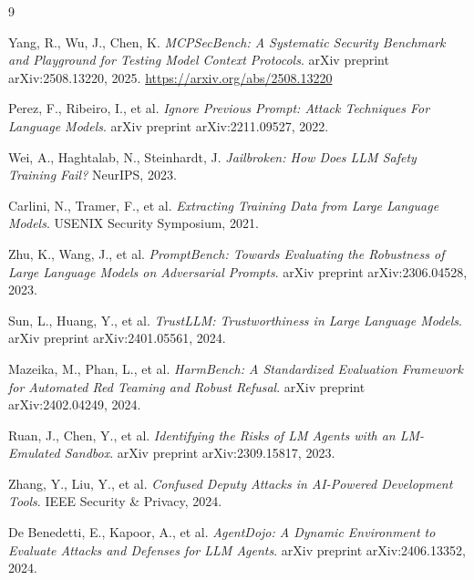 \documentclass[11pt]{article}
\begin{document}

\begin{thebibliography}{9}

Yang, R., Wu, J., Chen, K.
\emph{MCPSecBench: A Systematic Security Benchmark and Playground for Testing Model Context Protocols}.
arXiv preprint arXiv:2508.13220, 2025.
\url{https://arxiv.org/abs/2508.13220}

Perez, F., Ribeiro, I., et al.
\emph{Ignore Previous Prompt: Attack Techniques For Language Models}.
arXiv preprint arXiv:2211.09527, 2022.

Wei, A., Haghtalab, N., Steinhardt, J.
\emph{Jailbroken: How Does LLM Safety Training Fail?}
NeurIPS, 2023.

Carlini, N., Tramer, F., et al.
\emph{Extracting Training Data from Large Language Models}.
USENIX Security Symposium, 2021.

Zhu, K., Wang, J., et al.
\emph{PromptBench: Towards Evaluating the Robustness of Large Language Models on Adversarial Prompts}.
arXiv preprint arXiv:2306.04528, 2023.

Sun, L., Huang, Y., et al.
\emph{TrustLLM: Trustworthiness in Large Language Models}.
arXiv preprint arXiv:2401.05561, 2024.

Mazeika, M., Phan, L., et al.
\emph{HarmBench: A Standardized Evaluation Framework for Automated Red Teaming and Robust Refusal}.
arXiv preprint arXiv:2402.04249, 2024.

Ruan, J., Chen, Y., et al.
\emph{Identifying the Risks of LM Agents with an LM-Emulated Sandbox}.
arXiv preprint arXiv:2309.15817, 2023.

Zhang, Y., Liu, Y., et al.
\emph{Confused Deputy Attacks in AI-Powered Development Tools}.
IEEE Security \& Privacy, 2024.

De Benedetti, E., Kapoor, A., et al.
\emph{AgentDojo: A Dynamic Environment to Evaluate Attacks and Defenses for LLM Agents}.
arXiv preprint arXiv:2406.13352, 2024.

\end{thebibliography}
\end{document}
